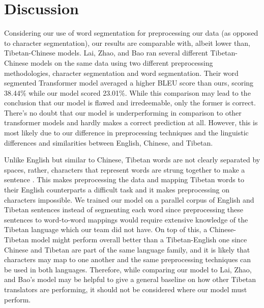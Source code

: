 \documentclass[letterpaper, 12 pt, conference]{ieeeconf}  %
\begin{document}
\section{Discussion}

Considering our use of word segmentation for preprocessing our data (as opposed to character segmentation), our results are comparable with, albeit lower than, Tibetan-Chinese models. Lai, Zhao, and Bao \cite{c2} ran several different Tibetan-Chinese models on the same data using two different preprocessing methodologies, character segmentation and word segmentation. Their word segmented Transformer model averaged a higher BLEU score than ours, scoring 38.44\% while our model scored 23.01\%. While this comparison may lead to the conclusion that our model is flawed and irredeemable, only the former is correct. There’s no doubt that our model is underperforming in comparison to other transformer models and hardly makes a correct prediction at all. However, this is most likely due to our difference in preprocessing techniques and the linguistic differences and similarities between English, Chinese, and Tibetan. 

Unlike English but similar to Chinese, Tibetan words are not clearly separated by spaces, rather, characters that represent words are strung together to make a sentence \cite{c5}. This makes preprocessing the data and mapping Tibetan words to their English counterparts a difficult task and it makes preprocessing on characters impossible. We trained our model on a parallel corpus of English and Tibetan sentences instead of segmenting each word since preprocessing these sentences to word-to-word mappings would require extensive knowledge of the Tibetan language which our team did not have. On top of this, a Chinese-Tibetan model might perform overall better than a Tibetan-English one since Chinese and Tibetan are part of the same language family, and it is likely that characters may map to one another and the same preprocessing techniques can be used in both languages. Therefore, while comparing our model to Lai, Zhao, and Bao’s \cite{c2} model may be helpful to give a general baseline on how other Tibetan translators are performing, it should not be considered where our model must perform.
\end{document}

